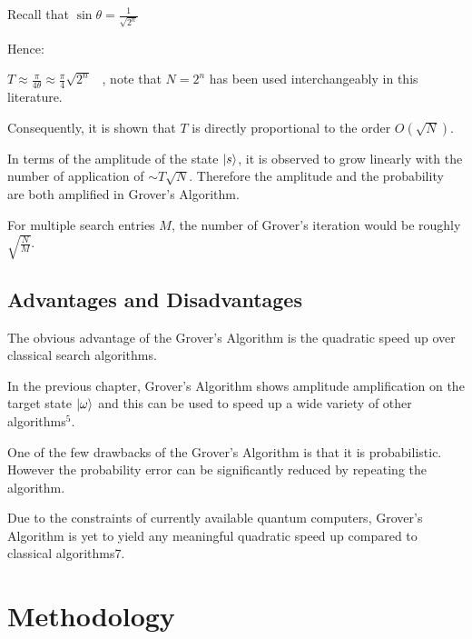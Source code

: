 \documentclass{article}
\begin{document}
\noindent
Recall that $\sin\theta = \frac{1}{\sqrt{2^n}}$
\vspace{5mm}

\noindent
Hence:
\vspace{5mm}

\noindent
\qquad $T \approx \frac{\pi}{4\theta} \approx \frac{\pi}{4}\sqrt{2^n}$ \ , note that $N = 2^n$ has been used interchangeably in this literature.
\vspace{5mm}

\noindent
Consequently, it is shown that $T$ is directly proportional to the order $O(\sqrt{N})$.
\pagebreak

\noindent
In terms of the amplitude of the state $\ket{s}$, it is observed to grow linearly with the number of application of $\sim T\sqrt{N}$. Therefore the amplitude and the probability are both amplified in Grover's Algorithm.
\vspace{5mm}

\noindent
For multiple search entries $M$, the number of Grover's iteration would be roughly $\sqrt{\frac{N}{M}}$.
\vspace{10mm}

\subsection{Advantages and Disadvantages}
\vspace{5mm}

\noindent
The obvious advantage of the Grover's Algorithm is the quadratic speed up over classical search algorithms. 
\vspace{5mm}

\noindent
In the previous chapter, Grover's Algorithm shows amplitude amplification on the target state $\ket{\omega}$ and this can be used to speed up a wide variety of other algorithms\hyperlink{5}{$^5$}. 
\vspace{5mm}

\noindent
One of the few drawbacks of the Grover's Algorithm is that it is probabilistic. However the probability error can be significantly reduced by repeating the algorithm.
\vspace{5mm}

\noindent
Due to the constraints of currently available quantum computers, Grover's Algorithm is yet to yield any  meaningful quadratic speed up compared to classical algorithms\hyperlink{7}{$7$}.   
\pagebreak

\section{Methodology}
\end{document}
